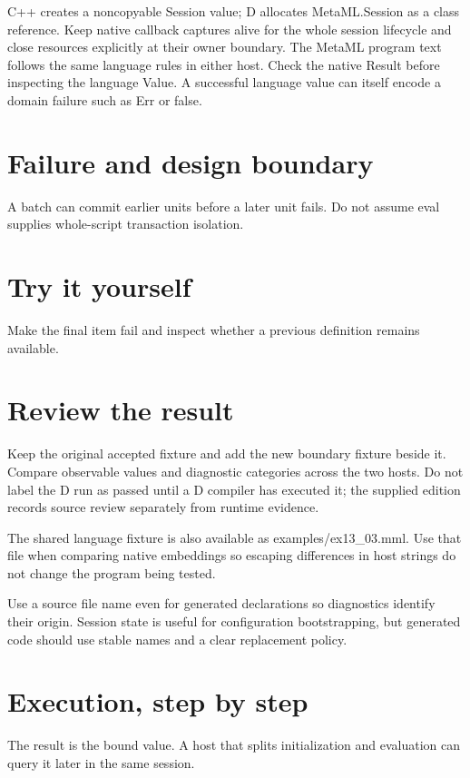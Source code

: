 \clearpage
{}
C++ creates a noncopyable Session value; D allocates MetaML.Session as a class reference. Keep native callback captures alive for the whole session lifecycle and close resources explicitly at their owner boundary. The MetaML program text follows the same language rules in either host. Check the native Result before inspecting the language Value. A successful language value can itself encode a domain failure such as Err or false.


\section*{Failure and design boundary}
A batch can commit earlier units before a later unit fails. Do not assume eval supplies whole-script transaction isolation.

\section*{Try it yourself}
Make the final item fail and inspect whether a previous definition remains available.

\section*{Review the result}
Keep the original accepted fixture and add the new boundary fixture beside it. Compare observable values and diagnostic categories across the two hosts. Do not label the D run as passed until a D compiler has executed it; the supplied edition records source review separately from runtime evidence.

The shared language fixture is also available as examples/ex13\_03.mml. Use that file when comparing native embeddings so escaping differences in host strings do not change the program being tested.

\clearpage
{}
Use a source file name even for generated declarations so diagnostics identify their origin. Session state is useful for configuration bootstrapping, but generated code should use stable names and a clear replacement policy.


\section*{Execution, step by step}
The result is the bound value. A host that splits initialization and evaluation can query it later in the same session.

